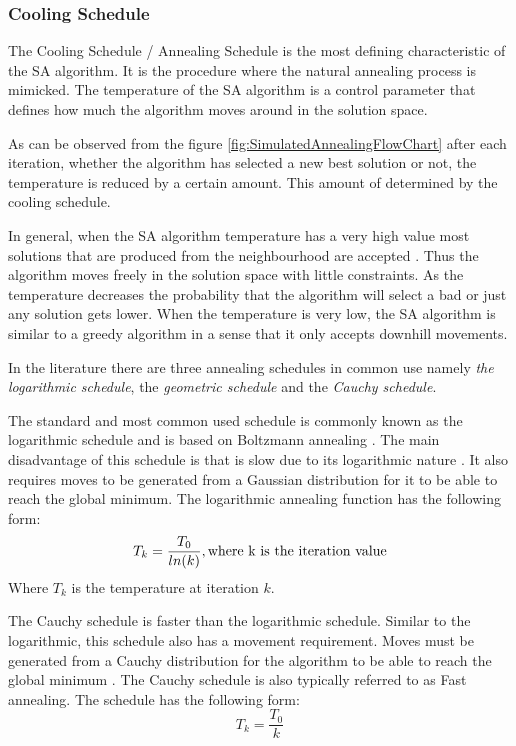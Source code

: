 \subsubsection{Cooling Schedule}
The Cooling Schedule / Annealing Schedule is the most defining characteristic of the SA algorithm. It is the procedure where the natural annealing process is mimicked. The temperature of the SA algorithm is a control parameter that defines how much the algorithm moves around in the solution space.

As can be observed from the figure \ref{fig:SimulatedAnnealingFlowChart} after each iteration, whether the algorithm has selected a new best solution or not, the temperature is reduced by a certain amount. This amount of determined by the cooling schedule.

In general, when the SA algorithm temperature has a very high value most solutions that are produced from the neighbourhood are accepted \cite{ClusterSA}. Thus the algorithm moves freely in the solution space with little constraints. As the temperature decreases the probability that the algorithm will select a bad or just any solution gets lower. When the temperature is very low, the SA algorithm is similar to a greedy algorithm in a sense that it only accepts downhill movements\cite{ClusterSA}.

In the literature there are three annealing schedules in common use namely \emph{the logarithmic schedule}, the \emph{geometric schedule} and the \emph{Cauchy schedule}\cite{VeryFastSAImageEnchancement,SASingleMultiObj}. 

The standard and most common used schedule is commonly known as the logarithmic schedule and is based on Boltzmann annealing \cite{VeryFastSAImageEnchancement}. The main disadvantage of this schedule is that is slow due to its logarithmic nature \cite{VeryFastSAImageEnchancement}. It also requires moves to be generated from a Gaussian distribution for it to be able to reach the global minimum\cite{SASingleMultiObj}. The logarithmic annealing function has the following form:
\begin{equation}
\label{eq:logcooling}
	T_k = \frac{T_0}{ln(k)},\text{where k is the iteration value}\\
\end{equation}
Where $T_k$ is the temperature at iteration $k$.

The Cauchy schedule is faster than the logarithmic schedule. Similar to the logarithmic, this schedule also has a movement requirement. Moves must be generated from a Cauchy distribution for the algorithm to be able to reach the global minimum \cite{SASingleMultiObj,VeryFastSAImageEnchancement}. The Cauchy schedule is also typically referred to as Fast annealing\cite{VeryFastSAImageEnchancement}. The schedule has the following form:
\begin{equation}
\label{eq:cauchycooling}
	T_k = \frac{T_0}{k}
\end{equation}

